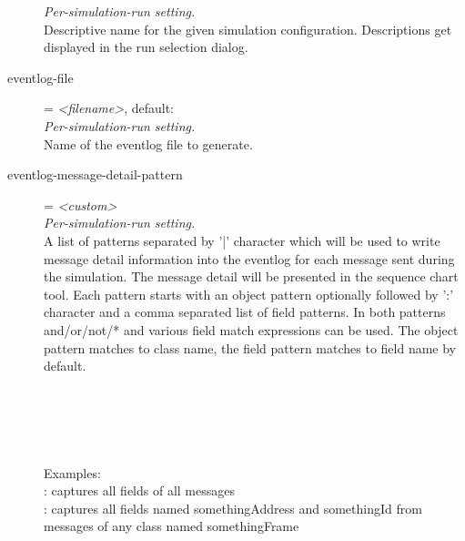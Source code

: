 \begin{description}
    \textit{Per-simulation-run setting.}\\
    Descriptive name for the given simulation configuration. Descriptions get
    displayed in the run selection dialog.
\item[eventlog-file] = \textit{<filename>}, default: \\
    \textit{Per-simulation-run setting.}\\
    Name of the eventlog file to generate.
\item[eventlog-message-detail-pattern] = \textit{<custom>}\\
    \textit{Per-simulation-run setting.}\\
    A list of patterns separated by '|' character which will be used to write
    message detail information into the eventlog for each message sent during
    the simulation. The message detail will be presented in the sequence chart
    tool. Each pattern starts with an object pattern optionally followed by ':'
    character and a comma separated list of field patterns. In both patterns
    and/or/not/* and various field match expressions can be used. The object
    pattern matches to class name, the field pattern matches to field name by
    default.\\

    \\
        \\
        \\
        \\
        \\
    Examples:\\
        \ttt{*}: captures all fields of all messages\\
        : captures all fields
    named somethingAddress and somethingId from messages of any class named
    somethingFrame\\


\end{description}

